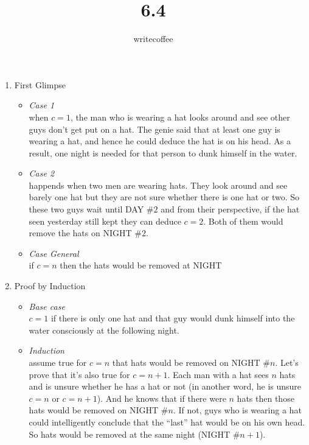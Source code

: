 \documentclass[11pt]{article}
\author{writecoffee} \title{6.4}
\begin{document}
\maketitle

{\setlength{\baselineskip}{1\baselineskip}
\setlength{\parindent}{0pt}
\setlength{\parskip}{2ex plus 0.5ex minus 0.2ex}
\begin{enumerate}[1.]
\item
	First Glimpse
	\begin{itemize}
	\item
	\emph{Case 1}\\
	when $c=1$, the man who is wearing a hat looks around and see other guys don't get put on a hat. %
	The genie said that at least one guy is wearing a hat, and hence he could deduce the hat is on his head. %
	As a result, one night is needed for that person to dunk himself in the water.
	\item
	\emph{Case 2}\\
	happends when two men are wearing hats. They look around and see barely one hat but they are not sure %
	whether there is one hat or two. So these two guys wait until DAY $\#2$ and from their perspective, if the hat seen yesterday %
	still kept they can deduce $c=2$. Both of them would remove the hats on NIGHT $\#2$.
	\item
	\emph{Case General}\\
	if $c=n$ then the hats would be removed at NIGHT %
	\end{itemize}
\item
	Proof by Induction
	\begin{itemize}
	\item
	\emph{Base case}\\
	$c=1$ if there is only one hat and that guy would dunk himself into the water consciously at the following night.
	\item
	\emph{Induction}\\
	assume true for $c=n$ that hats would be removed on NIGHT $\#n$. Let's prove that it's also true for $c=n+1$. %
	Each man with a hat sees $n$ hats and is unsure whether he has a hat or not (in another word, he is unsure $c=n$ %
	or $c=n+1$). And he knows that if there were $n$ hats then those hats would be removed on NIGHT $\#n$. If not, guys who %
	is wearing a hat could intelligently conclude that the ``last'' hat would be on his own head. So hats would be removed %
	at the same night (NIGHT $\#n+1$).
	\end{itemize}
\end{enumerate}
\par}
%
%
\end{document}
